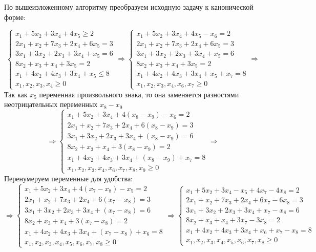 \documentclass{article}
\begin{document}
\noindent По вышеизложенному алгоритму преобразуем исходную задачу к канонической форме:

\begin{equation*}
 \begin{cases}
  x_1+5x_2+3x_4+4x_5 \ge 2 
   \\
   2x_1+x_2+7x_3+2x_4+6x_5 = 3
   \\
   3x_1+3x_2+2x_3+3x_4+x_5 = 6
   \\
   8x_2+x_3+x_4+3x_5 = 2
   \\
   x_1+4x_2+4x_3+3x_4+x_5 \le 8
   \\
   x_1, x_2, x_3, x_4 \ge 0
 \end{cases}
 \Rightarrow
 \begin{cases}
  x_1+5x_2+3x_4+4x_5-x_6 = 2 
   \\
   2x_1+x_2+7x_3+2x_4+6x_5 = 3
   \\
   3x_1+3x_2+2x_3+3x_4+x_5 = 6
   \\
   8x_2+x_3+x_4+3x_5 = 2
   \\
   x_1+4x_2+4x_3+3x_4+x_5+x_7 = 8
   \\
   x_1, x_2, x_3, x_4, x_6, x_7 \ge 0
 \end{cases}
 \Rightarrow
\end{equation*}
Так как $x_5$ переменная произвольного знака, то она заменяется разностями неотрицательных переменных $x_8 - x_9$
\begin{equation*}
\Rightarrow
 \begin{cases}
x_1+5x_2+3x_4+4(x_8 - x_9)-x_6 = 2 
\\
2x_1+x_2+7x_3+2x_4+6(x_8 - x_9) = 3
\\
3x_1+3x_2+2x_3+3x_4+(x_8 - x_9) = 6
\\
8x_2+x_3+x_4+3(x_8 - x_9) = 2
\\
x_1+4x_2+4x_3+3x_4+(x_8 - x_9)+x_7 = 8
\\
x_1, x_2, x_3, x_4, x_6, x_7, x_8, x_9 \ge 0
\end{cases}
\Rightarrow
\end{equation*}
Перенумеруем переменные для удобства:
\begin{equation*}
\Rightarrow
\begin{cases}
x_1+5x_2+3x_4+4(x_7 - x_8)-x_5 = 2 
\\
2x_1+x_2+7x_3+2x_4+6(x_7 - x_8) = 3
\\
3x_1+3x_2+2x_3+3x_4+(x_7 - x_8) = 6
\\
8x_2+x_3+x_4+3(x_7 - x_8) = 2
\\
x_1+4x_2+4x_3+3x_4+(x_7 - x_8)+x_6 = 8
\\
x_1, x_2, x_3, x_4, x_5, x_6, x_7, x_8 \ge 0
\end{cases}  
\Rightarrow
\begin{cases}
x_1+5x_2+3x_4-x_5+4x_7 - 4x_8 = 2 
\\
2x_1+x_2+7x_3+2x_4+6x_7 - 6x_8 = 3
\\
3x_1+3x_2+2x_3+3x_4+x_7 - x_8 = 6
\\
8x_2+x_3+x_4+3x_7 - 3x_8 = 2
\\
x_1+4x_2+4x_3+3x_4+x_6 +x_7 - x_8= 8
\\
x_1, x_2, x_3, x_4, x_5, x_6, x_7, x_8 \ge 0
\end{cases}  
\end{equation*}
\end{document}
